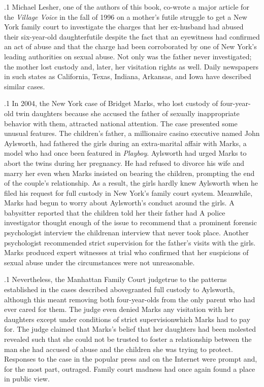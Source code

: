 \documentclass[11pt, twoside]{article}
\begin{document}
{\p.1{%
\:Michael Lesher, one of the authors of this book, co-wrote
a major article for the \textit{Village Voice} in the fall of 1996 on a mother’s futile struggle
to get a New York family court to investigate the charges that her
ex-husband had abused their six-year-old daughter\mdash{}futile despite the fact
that an eyewitness had confirmed an act of abuse and that the charge had
been corroborated by one of New York’s leading authorities on sexual
abuse. Not only was the father never investigated; the mother lost custody and, later, her visitation rights as well. Daily newspapers in such
states as California, Texas, Indiana, Arkansas, and Iowa have described
similar cases.\;
}%

\p.1{%
\:In 2004, the New York case of Bridget Marks, who lost custody of
four-year-old twin daughters because she accused the father of sexually
inappropriate behavior with them, attracted national attention. The case
presented some unusual features. The children’s father, a millionaire
casino executive named John Aylsworth, had fathered the girls during
an extra-marital affair with Marks, a model who had once been featured
in \textit{Playboy}. Aylsworth had urged Marks to abort the twins during her
pregnancy. He had refused to divorce his wife and marry her even when
Marks insisted on bearing the children, prompting the
end of the couple’s relationship. As a result, the girls hardly knew Aylsworth when he
filed his request for full custody in New York’s family court system.
Meanwhile, Marks had begun to worry about Aylsworth’s conduct
around the girls. A babysitter reported that the children told her their father had  A police investigator thought enough
of the issue to recommend that a prominent forensic psychologist interview the children\mdash{}an interview that never took place. Another
psychologist recommended strict supervision for the father’s visits with
the girls. Marks produced expert witnesses at trial who confirmed
that her suspicions of sexual abuse under the circumstances were not
unreasonable.\;
}%

\p.1{%
\:Nevertheless, the Manhattan Family Court judge\mdash{}true to the patterns established in the cases described above\mdash{}granted full custody
to Aylsworth, although this meant removing both four-year-olds from
the only parent who had ever cared for them. The judge even denied
Marks any visitation with her daughters except under conditions of
strict supervision\mdash{}which Marks had to pay for. The judge claimed
that Marks’s belief that her daughters had been molested revealed such
 that she could not be trusted to foster a  relationship between the man she had accused of abuse and the children she
was trying to protect. Responses to the case in the popular press and on
the Internet were prompt and, for the most part, outraged. Family court
madness had once again found a place in public view.\;
}%


}
\end{document}
